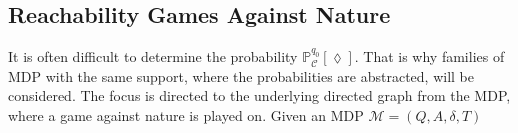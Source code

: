 \subsection{Reachability Games Against Nature}
It is often difficult to determine the probability $\mathbb{P}^{q_0}_\mathcal{C}[\lozenge]$. 
That is why families of MDP with the same support, where the probabilities are abstracted, will be considered. 
The focus is directed to the underlying directed graph from the MDP, where a game against nature is played on.
Given an MDP $\mathcal{M}=(Q,A,\delta,T)$